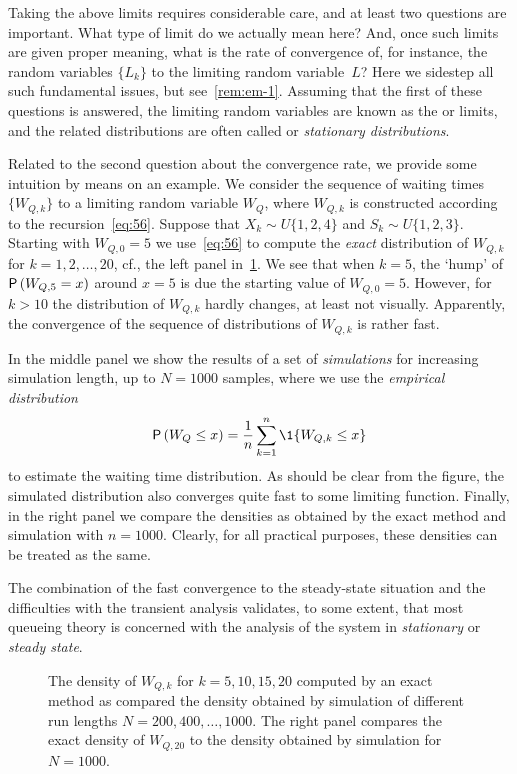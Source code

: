 Taking the above limits requires considerable care, and at least two questions are important.
What type of limit do we actually mean here?
And, once such limits are given proper meaning, what is the rate of convergence of, for instance, the random variables $\{L_k\}$ to the limiting random variable~$L$?
Here we sidestep all such fundamental issues, but see~\cref{rem:em-1}.
Assuming that the first of these questions is answered, the limiting random variables are known as the  or  limits, and the related distributions are often called  or \emph{stationary distributions}.

Related to the second question about the convergence rate, we provide some intuition by means on an example.
We consider the sequence of waiting times $\{W_{Q,k}\}$ to a limiting random variable $W_Q$, where $W_{Q,k}$ is constructed according to the recursion~\cref{eq:56}.
Suppose that $X_k\sim U\{1,2,4\}$ and $S_k\sim U\{1,2,3\}$.
Starting with $W_{Q,0}=5$ we use~\cref{eq:56} to compute the \emph{exact} distribution of $W_{Q,k}$ for $k=1,2,\ldots, 20$, cf., the left panel in~\cref{fig:convergence}.
We see that when $k=5$, the `hump' of $\P{W_{Q,5}=x}$ around $x=5$ is due the starting value of $W_{Q,0}=5$.
However, for $k>10$ the distribution of $W_{Q,k}$ hardly changes, at least not visually.
Apparently, the convergence of the sequence of distributions of $W_{Q,k}$ is rather fast.

In the middle panel we show the results of a set of \emph{simulations} for increasing simulation length, up to $N=1000$ samples, where we use the \emph{empirical distribution} 
\begin{equation*}
\P{W_Q\leq x} = \frac 1n \sum_{k=1}^n \1{W_{Q,k} \leq x}
\end{equation*}
to estimate the waiting time distribution. 
As should be clear from the figure, the simulated distribution also converges quite fast to some limiting function.
Finally, in the right panel we compare the densities as obtained by the exact method and simulation with $n=1000$.
Clearly, for all practical purposes, these densities can be treated as the same.


The combination of the fast convergence to the steady-state situation and the difficulties with the transient analysis validates, to some extent, that most queueing theory is concerned with the analysis of the system in \emph{stationary} or \emph{steady state}.

\begin{figure}
 \centering



 \caption{The density of $W_{Q,k}$ for $k=5, 10, 15, 20$ computed by
 an exact method as compared the density obtained by simulation of
 different run lengths $N=200, 400, \ldots, 1000$. The right panel
 compares the exact density of $W_{Q,20}$ to the density obtained by simulation
 for $N=1000$.}
\label{fig:convergence}
\end{figure}




